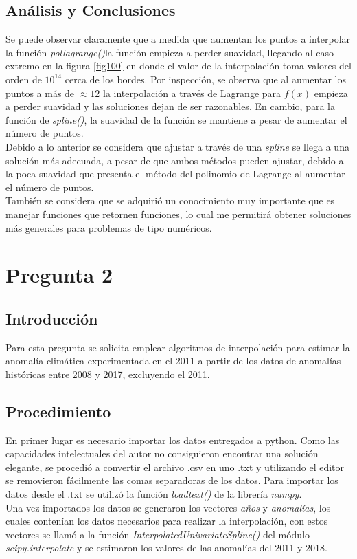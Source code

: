 \documentclass[10pt,a4paper]{article}
\begin{document}
\subsection{Análisis y Conclusiones}
Se puede observar claramente que a medida que aumentan los puntos a interpolar la función \textit{pol\textunderscore lagrange()}la función empieza a perder suavidad, llegando al caso extremo en la figura \ref{fig100} en donde el valor de la interpolación toma valores del orden de $10^{14}$ cerca de los bordes. Por inspección, se observa que al aumentar los puntos a más de $\approx 12$ la interpolación a través de Lagrange para $f(x)$ empieza a perder suavidad y las soluciones dejan de ser razonables. En cambio, para la función de \textit{spline()}, la suavidad de la función se mantiene a pesar de aumentar el número de puntos.\\

Debido a lo anterior se considera que ajustar a través de una \textit{spline} se llega a una solución más adecuada, a pesar de que ambos métodos pueden ajustar, debido a la poca suavidad que presenta el método del polinomio de Lagrange al aumentar el número de puntos.\\

También se considera que se adquirió un conocimiento muy importante que es manejar funciones que retornen funciones, lo cual me permitirá obtener soluciones más generales para problemas de tipo numéricos.

\newpage
\section{Pregunta 2}

\subsection{Introducción}
Para esta pregunta se solicita emplear algoritmos de interpolación para estimar la anomalía climática experimentada en el 2011 a partir de los datos de anomalías históricas entre 2008 y 2017, excluyendo el 2011.\\

\subsection{Procedimiento}
En primer lugar es necesario importar los datos entregados a python. Como las capacidades intelectuales del autor no consiguieron  encontrar una solución elegante, se procedió a convertir el archivo .csv en uno .txt y utilizando el editor se removieron fácilmente las comas separadoras de los datos. Para importar los datos desde el .txt se utilizó la función \textit{loadtext()} de la librería \textit{numpy}.\\
Una vez importados los datos se generaron los vectores \textit{años} y \textit{anomalías}, los cuales contenían los datos necesarios para realizar la interpolación, con estos vectores se llamó a la función \textit{InterpolatedUnivariateSpline()} del módulo \textit{scipy.interpolate} y se estimaron los valores de las anomalías del 2011 y 2018.
\end{document}
